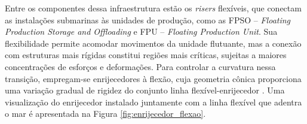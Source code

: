 \documentclass[arial,centeredequations,english,brazilian,oneside,section=TITLE]{ifes8}
\begin{document}
Entre os componentes dessa infraestrutura estão os \emph{risers} flexíveis, que conectam as instalações 
submarinas às unidades de produção, como as FPSO -- \emph{Floating Production Storage and Offloading} e 
FPU -- \emph{Floating Production Unit}. Sua flexibilidade permite acomodar movimentos da unidade flutuante, mas
a conexão com estruturas mais rígidas constitui regiões mais críticas, sujeitas a maiores concentrações de 
esforços e deformações. Para controlar a curvatura nessa transição, empregam-se enrijecedores à flexão, cuja 
geometria cônica proporciona uma variação gradual de rigidez do conjunto linha flexível-enrijecedor 
\cite{Caire2011,Lopes2025}. Uma visualização do enrijecedor instalado juntamente com a linha flexível que 
adentra o mar é apresentada na Figura \ref{fig:enrijecedor_flexao}.



\end{document}
